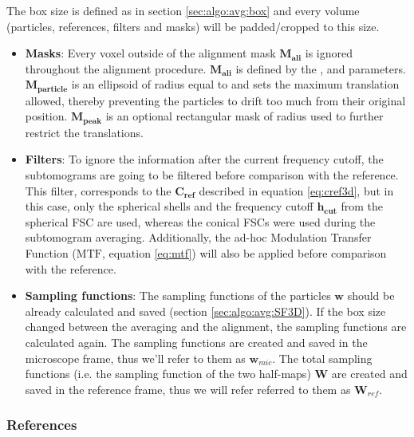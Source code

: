 The box size is defined as in section \ref{sec:algo:avg:box} and every volume (particles, references, filters and masks) will be padded/cropped to this size.
\begin{itemize}
    \item \textbf{Masks}: Every voxel outside of the alignment mask $\bm{M_{ali}}$ is ignored throughout the alignment procedure. $\bm{M_{ali}}$ is defined by the ,  and  parameters. $\bm{M_{particle}}$ is an ellipsoid of radius equal to  and sets the maximum translation allowed, thereby preventing the particles to drift too much from their original position. $\bm{M_{peak}}$ is an optional rectangular mask of radius  used to further restrict the translations.
    
    \item \textbf{Filters}: To ignore the information after the current frequency cutoff, the subtomograms are going to be filtered before comparison with the reference. This filter, corresponds to the $\bm{C_{ref}}$ described in equation \ref{eq:cref3d}, but in this case, only the spherical shells and the frequency cutoff $\bm{h_{cut}}$ from the spherical FSC are used, whereas the conical FSCs were used during the subtomogram averaging. Additionally, the ad-hoc Modulation Transfer Function ($\bm{\mathrm{MTF}}$, equation \ref{eq:mtf}) will also be applied before comparison with the reference.
    
    \item \textbf{Sampling functions}: The sampling functions of the particles $\bm{w}$ should be already calculated and saved (section \ref{sec:algo:avg:SF3D}). If the box size changed between the averaging and the alignment, the sampling functions are calculated again. The sampling functions are created and saved in the microscope frame, thus we'll refer to them as $\bm{w}_{mic}$. The total sampling functions (i.e. the sampling function of the two half-maps) $\bm{W}$ are created and saved in the reference frame, thus we will refer referred to them as $\bm{W}_{ref}$.
\end{itemize}

\subsubsection{References}

